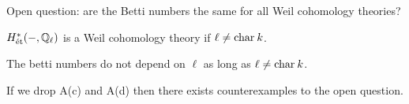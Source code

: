 \documentclass[12pt]{article}
\begin{document}
\begin{remark}
Open question: are the Betti numbers the same for all Weil cohomology theories?
\end{remark}

\begin{theorem}
$H^*_{\text{\'{e}t}}(-, \mathbb{Q}_\ell)$ is a Weil cohomology theory if $\ell \neq \mathrm{char} \: k$. 
\end{theorem}

\begin{theorem}
The \etale betti numbers do not depend on $\ell$ as long as $\ell \neq \mathrm{char} \: k$.
\end{theorem}

\begin{proposition}
If we drop A(c) and A(d) then there exists counterexamples to the open question. 
\end{proposition}
\end{document}
